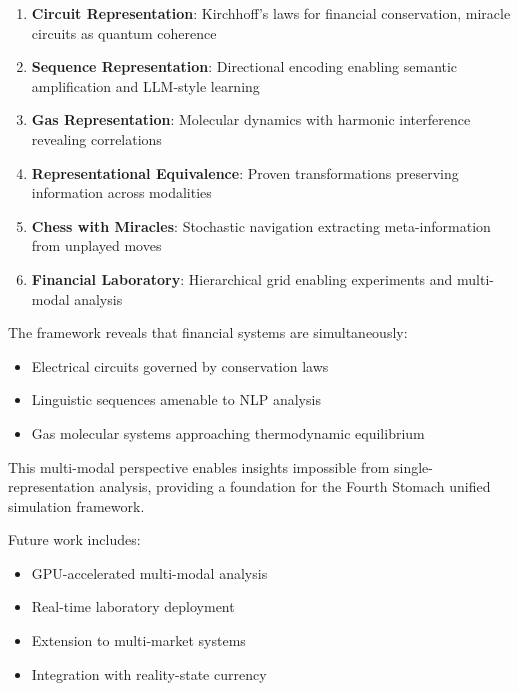 \documentclass[12pt]{article}
\begin{document}
\begin{enumerate}
    \item \textbf{Circuit Representation}: Kirchhoff's laws for financial conservation, miracle circuits as quantum coherence
    \item \textbf{Sequence Representation}: Directional encoding enabling semantic amplification and LLM-style learning
    \item \textbf{Gas Representation}: Molecular dynamics with harmonic interference revealing correlations
    \item \textbf{Representational Equivalence}: Proven transformations preserving information across modalities
    \item \textbf{Chess with Miracles}: Stochastic navigation extracting meta-information from unplayed moves
    \item \textbf{Financial Laboratory}: Hierarchical grid enabling experiments and multi-modal analysis
\end{enumerate}

The framework reveals that financial systems are simultaneously:
\begin{itemize}
    \item Electrical circuits governed by conservation laws
    \item Linguistic sequences amenable to NLP analysis
    \item Gas molecular systems approaching thermodynamic equilibrium
\end{itemize}

This multi-modal perspective enables insights impossible from single-representation analysis, providing a foundation for the Fourth Stomach unified simulation framework.

Future work includes:
\begin{itemize}
    \item GPU-accelerated multi-modal analysis
    \item Real-time laboratory deployment
    \item Extension to multi-market systems
    \item Integration with reality-state currency
\end{itemize}
\end{document}
